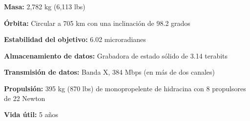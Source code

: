 	\textbf{Masa:} 2,782 kg (6,113 lbs)
	
	\textbf{Órbita:} Circular a 705 km con una inclinación de 98.2 grados
	
	\textbf{Estabilidad del objetivo:} 6.02 microradianes
	
	\textbf{Almacenamiento de datos:} Grabadora de estado sólido de 3.14 terabits
	
	\textbf{Transmisión de datos:} Banda X, 384 Mbps (en más de dos canales)
	
	\textbf{Propulsión:} 395 kg (870 lbs) de monopropelente de hidracina con 8 propulsores de 22 Newton
	
	\textbf{Vida útil:} 5 años
	

